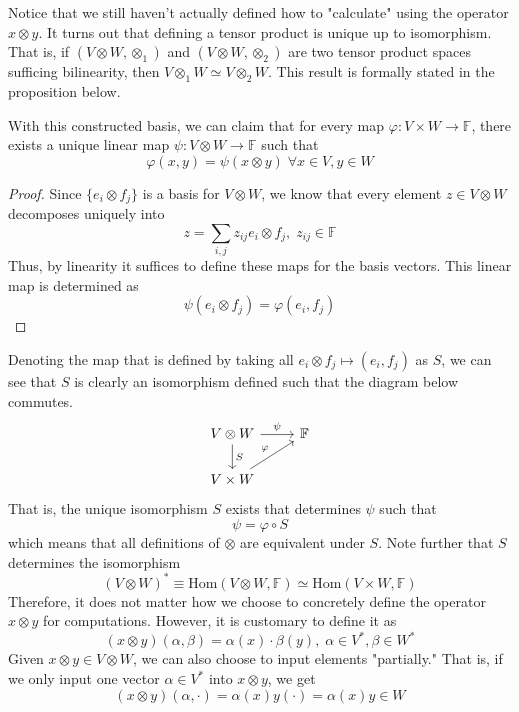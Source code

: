 \documentclass{article}
\begin{document}
    Notice that we still haven't actually defined how to "calculate" using the operator $x \otimes y$. It turns out that defining a tensor product is unique up to isomorphism. That is, if $(V \otimes W, \otimes_1)$ and $(V \otimes W, \otimes_2)$ are two tensor product spaces sufficing bilinearity, then $V \otimes_1 W \simeq V \otimes_2 W$. This result is formally stated in the proposition below. 

    \begin{proposition}
    With this constructed basis, we can claim that for every map $\varphi: V \times W \longrightarrow \mathbb{F}$, there exists a unique linear map $\psi: V \otimes W \longrightarrow \mathbb{F}$ such that 
    \[\varphi (x, y) = \psi (x \otimes y) \; \forall x \in V, y \in W\]
    \end{proposition}
    \begin{proof}
    Since $\{e_i \otimes f_j\}$ is a basis for $V \otimes W$, we know that every element $z \in V \otimes W$ decomposes uniquely into 
    \[z = \sum_{i, j} z_{i j} e_i \otimes f_j, \; z_{i j} \in \mathbb{F}\]
    Thus, by linearity it suffices to define these maps for the basis vectors. This linear map is determined as 
    \[\psi (e_i \otimes f_j) = \varphi (e_i, f_j)\]
    \end{proof}
    Denoting the map that is defined by taking all $e_i \otimes f_j \mapsto (e_i, f_j)$ as $S$, we can see that $S$ is clearly an isomorphism defined such that the diagram below commutes. 
    \[\begin{tikzcd}
        V \otimes W \arrow{r}{\psi} \arrow{d}{S} & \mathbb{F} \\
        V \times W \arrow{ru}{\varphi}
    \end{tikzcd}\]
    That is, the unique isomorphism $S$ exists that determines $\psi$ such that 
    \[\psi = \varphi \circ S \] 
    which means that all definitions of $\otimes$ are equivalent under $S$. Note further that $S$ determines the isomorphism 
    \[(V \otimes W)^* \equiv \text{Hom}(V \otimes W, \mathbb{F}) \simeq \text{Hom}(V \times W, \mathbb{F})\]
    Therefore, it does not matter how we choose to concretely define the operator $x \otimes y$ for computations. However, it is customary to define it as
    \[(x \otimes y) (\alpha, \beta) = \alpha (x) \cdot \beta (y), \; \alpha \in V^*, \beta \in W^*\]
    Given $x \otimes y \in V \otimes W$, we can also choose to input elements "partially." That is, if we only input one vector $\alpha \in V^*$ into $x \otimes y$, we get
    \[(x \otimes y) (\alpha, \cdot) = \alpha(x) y (\cdot) = \alpha (x) y \in W\]
\end{document}

